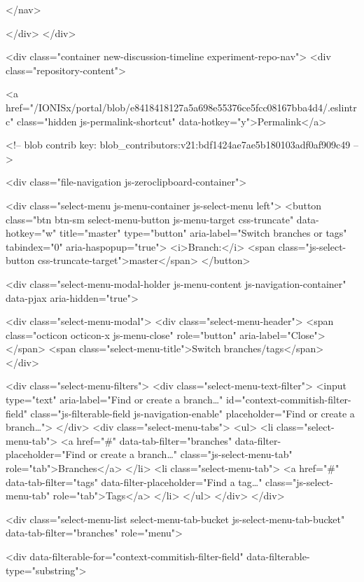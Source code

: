 </nav>

  </div>
</div>

<div class="container new-discussion-timeline experiment-repo-nav">
  <div class="repository-content">

    

<a href="/IONISx/portal/blob/e8418418127a5a698e55376ce5fcc08167bba4d4/.eslintrc" class="hidden js-permalink-shortcut" data-hotkey="y">Permalink</a>

<!-- blob contrib key: blob_contributors:v21:bdf1424ae7ae5b180103adf0af909c49 -->

<div class="file-navigation js-zeroclipboard-container">
  
<div class="select-menu js-menu-container js-select-menu left">
  <button class="btn btn-sm select-menu-button js-menu-target css-truncate" data-hotkey="w"
    title="master"
    type="button" aria-label="Switch branches or tags" tabindex="0" aria-haspopup="true">
    <i>Branch:</i>
    <span class="js-select-button css-truncate-target">master</span>
  </button>

  <div class="select-menu-modal-holder js-menu-content js-navigation-container" data-pjax aria-hidden="true">

    <div class="select-menu-modal">
      <div class="select-menu-header">
        <span class="octicon octicon-x js-menu-close" role="button" aria-label="Close"></span>
        <span class="select-menu-title">Switch branches/tags</span>
      </div>

      <div class="select-menu-filters">
        <div class="select-menu-text-filter">
          <input type="text" aria-label="Find or create a branch…" id="context-commitish-filter-field" class="js-filterable-field js-navigation-enable" placeholder="Find or create a branch…">
        </div>
        <div class="select-menu-tabs">
          <ul>
            <li class="select-menu-tab">
              <a href="#" data-tab-filter="branches" data-filter-placeholder="Find or create a branch…" class="js-select-menu-tab" role="tab">Branches</a>
            </li>
            <li class="select-menu-tab">
              <a href="#" data-tab-filter="tags" data-filter-placeholder="Find a tag…" class="js-select-menu-tab" role="tab">Tags</a>
            </li>
          </ul>
        </div>
      </div>

      <div class="select-menu-list select-menu-tab-bucket js-select-menu-tab-bucket" data-tab-filter="branches" role="menu">

        <div data-filterable-for="context-commitish-filter-field" data-filterable-type="substring">



